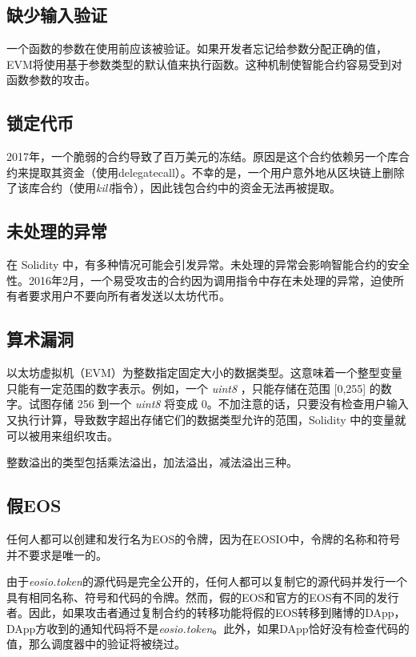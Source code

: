 \documentclass{SCIS2022cn}
\begin{document}
\subsection{缺少输入验证}

一个函数的参数在使用前应该被验证。如果开发者忘记给参数分配正确的值，EVM将使用基于参数类型的默认值来执行函数。这种机制使智能合约容易受到对函数参数的攻击。

\subsection{锁定代币}


2017年，一个脆弱的合约导致了百万美元的冻结。原因是这个合约依赖另一个库合约来提取其资金（使用delegatecall）。不幸的是，一个用户意外地从区块链上删除了该库合约（使用\textit{kill}指令），因此钱包合约中的资金无法再被提取。

\subsection{未处理的异常}

在 Solidity 中，有多种情况可能会引发异常。未处理的异常会影响智能合约的安全性。2016年2月，一个易受攻击的合约因为调用指令中存在未处理的异常，迫使所有者要求用户不要向所有者发送以太坊代币。

\subsection{算术漏洞}

以太坊虚拟机（EVM）为整数指定固定大小的数据类型。这意味着一个整型变量只能有一定范围的数字表示。例如，一个 \textit{uint8} ，只能存储在范围 [0,255] 的数字。试图存储 256 到一个 \textit{uint8} 将变成 0。不加注意的话，只要没有检查用户输入又执行计算，导致数字超出存储它们的数据类型允许的范围，Solidity 中的变量就可以被用来组织攻击。

整数溢出的类型包括乘法溢出，加法溢出，减法溢出三种。

\subsection{假EOS}

任何人都可以创建和发行名为EOS的令牌，因为在EOSIO中，令牌的名称和符号并不要求是唯一的。

由于\textit{eosio.token}的源代码是完全公开的，任何人都可以复制它的源代码并发行一个具有相同名称、符号和代码的令牌。然而，假的EOS和官方的EOS有不同的发行者。因此，如果攻击者通过复制合约的转移功能将假的EOS转移到赌博的DApp，DApp方收到的通知代码将不是\textit{eosio.token}。此外，如果DApp恰好没有检查代码的值，那么调度器中的验证将被绕过。
\end{document}
